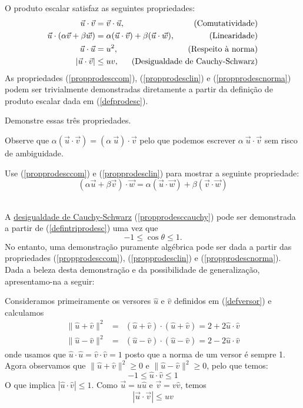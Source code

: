 O produto escalar satisfaz as seguintes propriedades:
\begin{subequations}\label{proprodesc}
\begin{align}
\vec{u}\cdot\vec{v}&=\vec{v}\cdot\vec{u},&\text{(Comutatividade)}\label{propprodesccom}\\
\vec{u}\cdot\left(\alpha\vec{v}+\beta \vec{w}\right)&=\alpha(\vec{u}\cdot\vec{v})+\beta(\vec{u}\cdot\vec{w}),\hspace{-5cm}&\text{(Linearidade)}\label{propprodesclin}\\
\vec{u}\cdot\vec{u}&=u^2,&\text{(Respeito à norma)}\label{propprodescnorma}\\
\left|\vec{u}\cdot\vec{v}\right|&\leq uv,&\text{(Desigualdade de Cauchy-Schwarz)}\label{propprodesccauchy}
\end{align}
\end{subequations}
As propriedades (\ref{propprodesccom}), (\ref{propprodesclin}) e (\ref{propprodescnorma}) podem ser trivialmente demonstradas diretamente a partir da definição de produto escalar dada em (\ref{defprodesc}).
\begin{exer} Demonstre essas três propriedades.
\end{exer}
Observe que $\alpha(\vec{u}\cdot\vec{v})=(\alpha~\!\vec{u})\cdot\vec{v}$ pelo que podemos escrever $\alpha~\!\vec{u}\cdot\vec{v}$ sem risco de ambiguidade.  
\begin{exer} Use (\ref{propprodesccom}) e  (\ref{propprodesclin}) para mostrar a seguinte propriedade:
$$
\left(\alpha\vec{u}+\beta \vec{v}\right)\cdot \vec{w}=\alpha (\vec{u}\cdot\vec{w})+ \beta (\vec{v}\cdot\vec{w})
$$

\end{exer}
~~ \\

A \underline{desigualdade de Cauchy-Schwarz} (\ref{propprodesccauchy}) pode ser demonstrada a partir de (\ref{defintriprodesc}) uma vez que $$-1\leq \cos\theta \leq 1.$$
No entanto, uma demonstração puramente algébrica pode ser dada a partir das propriedades (\ref{propprodesccom}), (\ref{propprodesclin}) e (\ref{propprodescnorma}). Dada a beleza desta demonstração e da possibilidade de generalização, apresentamo-na a seguir:

Consideramos primeiramente os versores $\hat{u}$ e $\hat{v}$ definidos em (\ref{defversor}) e calculamos
\begin{eqnarray*}
\|\hat{u}+\hat{v}\|^2 &=& \left(\hat{u}+\hat{v}\right)\cdot \left(\hat{u}+\hat{v}\right) = 2+2\hat{u}\cdot\hat{v} \\
\|\hat{u}-\hat{v}\|^2 &=& \left(\hat{u}-\hat{v}\right)\cdot \left(\hat{u}-\hat{v}\right) = 2-2\hat{u}\cdot\hat{v} 
\end{eqnarray*}
onde usamos que $\hat{u}\cdot\hat{u}=\hat{v}\cdot\hat{v}=1$ posto que a norma de um versor é sempre 1. Agora observamos que $\|\hat{u}+\hat{v}\|^2\geq 0 $ e $\|\hat{u}-\hat{v}\|^2\geq 0 $, pelo que temos:
$$-1\leq \hat{u}\cdot\hat{v} \leq 1$$
O que implica $|\hat{u}\cdot\hat{v}|\leq 1$. Como $\vec{u}=u\hat{u} $ e $\vec{v}=v\hat{v}$, temos
$$|\vec{u}\cdot\vec{v}|\leq uv$$ 

